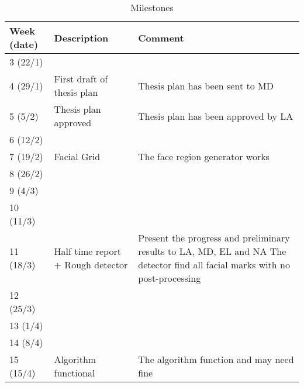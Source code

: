 \begin{table}[H]
\centering
\caption{Milestones}
\label{table:milestones}
\begin{tabular}{|p{}|p{}|p{}|}
	\hline
	\textbf{Week (date)} & \textbf{Description}                  & \textbf{Comment}                                                                                                                      \\ \hline
	3 (22/1)             &                                       &  \\ \hline
	4 (29/1)             & First draft of thesis plan            & Thesis plan has been sent to MD                                                                                                       \\ \hline
	5 (5/2)              & Thesis plan approved                  & Thesis plan has been approved by LA                                                                                                   \\ \hline
	6 (12/2)             &                                       &  \\ \hline
	7 (19/2)             & Facial Grid                           & The face region generator works                                                                                                       \\ \hline
	8 (26/2)             &                                       &  \\ \hline
	9 (4/3)              &                                       &  \\ \hline
	10 (11/3)            &                                       &  \\ \hline
	11 (18/3)            & Half time report + Rough detector     & Present the progress and preliminary results to LA, MD, EL and NA \newline The detector find all facial marks with no post-processing \\ \hline
	12 (25/3)            &                                       &  \\ \hline
	13 (1/4)             &                                       &  \\ \hline
	14 (8/4)             &                                       &  \\ \hline
	15 (15/4)            & Algorithm functional                  & The algorithm function and may need fine                                                                                              \\ \hline

\end{tabular}
\end{table}
